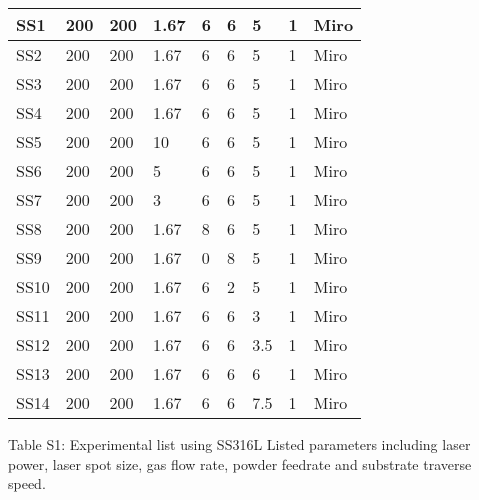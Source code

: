 \documentclass[10pt]{article}
\begin{document}
\begin{center}
\begin{tabular}{|l|l|l|l|l|l|l|l|l|}
\hline
SS1 & 200 & 200 & 1.67 & 6 & 6 & 5 & 1 & Miro \\
\hline
SS2 & 200 & 200 & 1.67 & 6 & 6 & 5 & 1 & Miro \\
\hline
SS3 & 200 & 200 & 1.67 & 6 & 6 & 5 & 1 & Miro \\
\hline
SS4 & 200 & 200 & 1.67 & 6 & 6 & 5 & 1 & Miro \\
\hline
SS5 & 200 & 200 & 10 & 6 & 6 & 5 & 1 & Miro \\
\hline
SS6 & 200 & 200 & 5 & 6 & 6 & 5 & 1 & Miro \\
\hline
SS7 & 200 & 200 & 3 & 6 & 6 & 5 & 1 & Miro \\
\hline
SS8 & 200 & 200 & 1.67 & 8 & 6 & 5 & 1 & Miro \\
\hline
SS9 & 200 & 200 & 1.67 & 0 & 8 & 5 & 1 & Miro \\
\hline
SS10 & 200 & 200 & 1.67 & 6 & 2 & 5 & 1 & Miro \\
\hline
SS11 & 200 & 200 & 1.67 & 6 & 6 & 3 & 1 & Miro \\
\hline
SS12 & 200 & 200 & 1.67 & 6 & 6 & 3.5 & 1 & Miro \\
\hline
SS13 & 200 & 200 & 1.67 & 6 & 6 & 6 & 1 & Miro \\
\hline
SS14 & 200 & 200 & 1.67 & 6 & 6 & 7.5 & 1 & Miro \\
\hline
\end{tabular}
\end{center}

Table S1: Experimental list using SS316L Listed parameters including laser power, laser spot size, gas flow rate, powder feedrate and substrate traverse speed.
\end{document}
